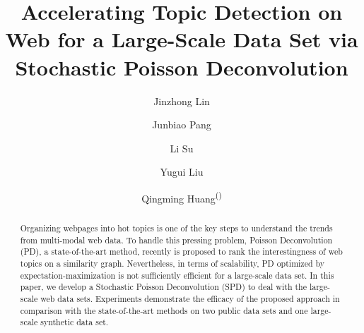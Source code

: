 \documentclass[runningheads]{llncs}
\begin{document}
%
\title{Accelerating Topic Detection on Web for a Large-Scale Data Set via Stochastic Poisson Deconvolution}
%
%
\author{Jinzhong Lin \and
Junbiao Pang \and
Li Su \and
Yugui Liu \and
Qingming Huang\textsuperscript{(\Letter)}}
%
\maketitle              %
%
\begin{abstract}
Organizing webpages into hot topics is one of the key steps to understand the trends from multi-modal web data. To handle this pressing problem, Poisson Deconvolution (PD), a state-of-the-art method, recently is proposed to rank the interestingness of web topics on a similarity graph. Nevertheless, in terms of scalability, PD optimized by expectation-maximization is not sufficiently efficient for a large-scale data set. In this paper, we develop a Stochastic Poisson Deconvolution (SPD) to deal with the large-scale web data sets. Experiments demonstrate the efficacy of the proposed approach in comparison with the state-of-the-art methods on two public data sets and one large-scale synthetic data set.

\end{abstract}
%
%
%
\end{document}

